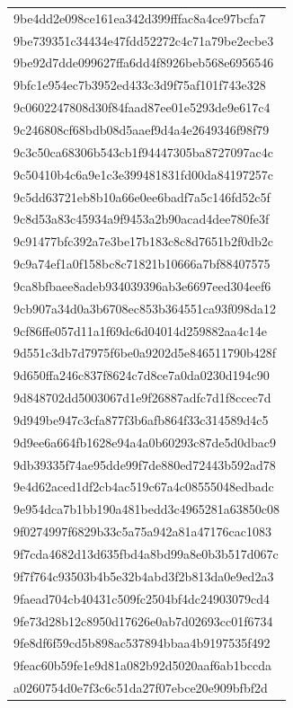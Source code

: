 \begin{tabular}{l}
9be4dd2e098ce161ea342d399fffac8a4ce97bcfa7 \\
9be739351c34434e47fdd52272c4c71a79be2ecbe3 \\
9be92d7dde099627ffa6dd4f8926beb568e6956546 \\
9bfc1e954ec7b3952ed433c3d9f75af101f743e328 \\
9c0602247808d30f84faad87ee01e5293de9e617c4 \\
9c246808cf68bdb08d5aaef9d4a4e2649346f98f79 \\
9c3c50ca68306b543cb1f94447305ba8727097ac4c \\
9c50410b4c6a9e1c3e399481831fd00da84197257c \\
9c5dd63721eb8b10a66e0ee6badf7a5c146fd52c5f \\
9c8d53a83c45934a9f9453a2b90acad4dee780fe3f \\
9c91477bfc392a7e3be17b183c8c8d7651b2f0db2c \\
9c9a74ef1a0f158bc8c71821b10666a7bf88407575 \\
9ca8bfbaee8adeb934039396ab3e6697eed304eef6 \\
9cb907a34d0a3b6708ec853b364551ca93f098da12 \\
9cf86ffe057d11a1f69dc6d04014d259882aa4c14e \\
9d551c3db7d7975f6be0a9202d5e846511790b428f \\
9d650ffa246c837f8624c7d8ce7a0da0230d194c90 \\
9d848702dd5003067d1e9f26887adfc7d1f8ccec7d \\
9d949be947c3cfa877f3b6afb864f33c314589d4c5 \\
9d9ee6a664fb1628e94a4a0b60293c87de5d0dbac9 \\
9db39335f74ae95dde99f7de880ed72443b592ad78 \\
9e4d62aced1df2cb4ac519c67a4c08555048edbadc \\
9e954dca7b1bb190a481bedd3c4965281a63850c08 \\
9f0274997f6829b33c5a75a942a81a47176cac1083 \\
9f7cda4682d13d635fbd4a8bd99a8e0b3b517d067c \\
9f7f764c93503b4b5e32b4abd3f2b813da0e9ed2a3 \\
9faead704cb40431c509fc2504bf4dc24903079cd4 \\
9fe73d28b12c8950d17626e0ab7d02693cc01f6734 \\
9fe8df6f59cd5b898ac537894bbaa4b9197535f492 \\
9feac60b59fe1e9d81a082b92d5020aaf6ab1bccda \\
a0260754d0e7f3c6c51da27f07ebce20e909bfbf2d \\

\end{tabular}

